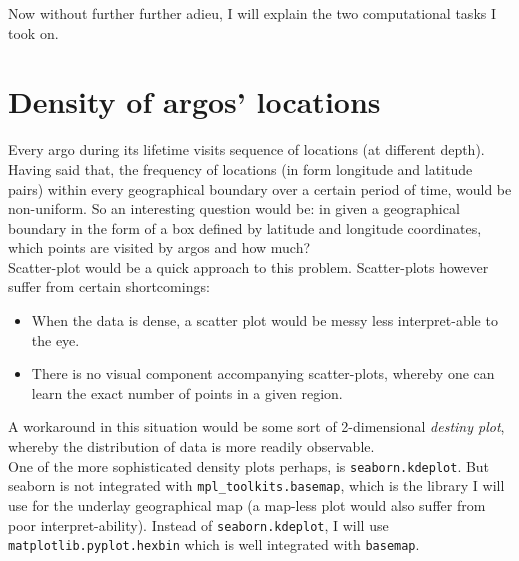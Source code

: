 \documentclass[12pt]{article}
\begin{document}
Now without further further adieu, I will explain the two computational tasks I
took on.

\section{Density of argos' locations}

Every argo during its lifetime visits sequence of 
locations (at different depth). Having said that, the frequency of
locations (in form longitude and latitude pairs) within every geographical boundary over a certain period of time,
would be non-uniform. So an interesting question would be: in given a geographical boundary in the form of a box defined
by latitude and longitude coordinates, which points are visited by argos and how much?\\

Scatter-plot would be a quick approach to this problem. Scatter-plots however suffer from certain shortcomings:

\begin{itemize}
    \item When the data is dense, a scatter plot would be messy less interpret-able to the eye. 
    \item There is no visual component accompanying scatter-plots, whereby one can learn the exact number of points in a given region.
\end{itemize}

A workaround in this situation would be some sort of 2-dimensional \textit{destiny plot}, whereby
the distribution of data is more readily observable. \\

One of the more sophisticated density plots perhaps, is 
\verb|seaborn.kdeplot|. 
But seaborn is not integrated with \verb|mpl_toolkits.basemap|,
which is the library I will use for the underlay geographical 
map (a map-less plot would also suffer from poor interpret-ability). 
Instead of \verb|seaborn.kdeplot|, I will use 
\verb|matplotlib.pyplot.hexbin| which
is well integrated with \verb|basemap|.\\
\end{document}
